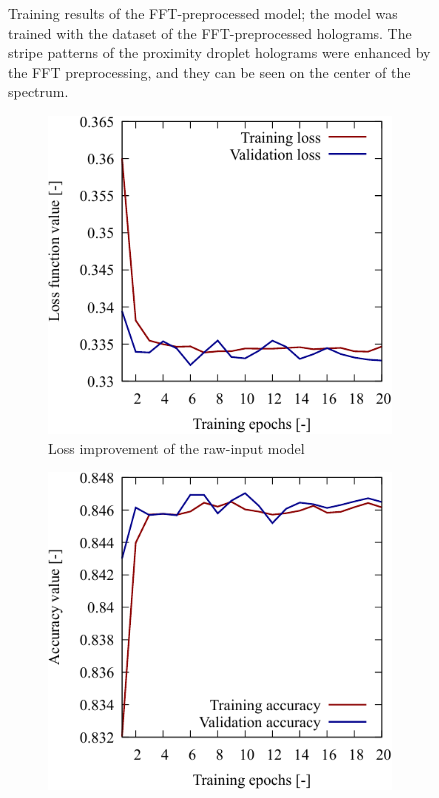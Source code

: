 \begin{figure}[H]
    \caption{Training results of the FFT-preprocessed model; the model was trained with the dataset of the FFT-preprocessed holograms. The stripe patterns of the proximity droplet holograms were enhanced by the FFT preprocessing, and they can be seen on the center of the spectrum.} 
    \label{fig:stripePatternExpExample}
\end{figure}

\begin{figure}[H]
    \centering
    \begin{subfigure}[c]{0.45\linewidth}
        \includegraphics[width=\linewidth]{./Figure/4_Results/training/loss_raw.pdf}
        \caption{Loss improvement of the raw-input model}
        \label{fig:stripePatternExpExample:a}
    \end{subfigure}
    \hfill
    \begin{subfigure}[c]{0.45\linewidth}
        \includegraphics[width=\linewidth]{./Figure/4_Results/training/acc_raw.pdf}

\end{subfigure}
\end{figure}
